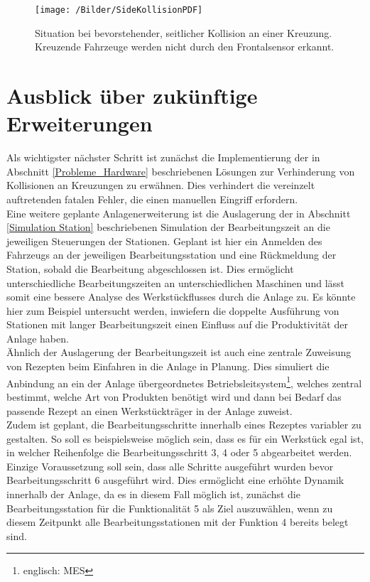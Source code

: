		\begin{figure}[h]
			\centering
			\texttt{[image: /Bilder/SideKollisionPDF]}
			\vspace{0.2cm}
			\caption{Situation bei bevorstehender, seitlicher Kollision an einer Kreuzung. Kreuzende Fahrzeuge werden nicht durch den Frontalsensor erkannt.}\label{SideKollision}
		\end{figure}
	
\section{Ausblick über zukünftige Erweiterungen}
	
	Als wichtigster nächster Schritt ist zunächst die Implementierung der in Abschnitt \ref{Probleme_Hardware} beschriebenen Lösungen zur Verhinderung von Kollisionen an Kreuzungen zu erwähnen. Dies verhindert die vereinzelt auftretenden fatalen Fehler, die einen manuellen Eingriff erfordern.\\
	Eine weitere  geplante Anlagenerweiterung ist die Auslagerung der in Abschnitt \ref{Simulation Station} beschriebenen Simulation der Bearbeitungszeit an die jeweiligen Steuerungen der Stationen. Geplant ist hier ein Anmelden des Fahrzeugs an der jeweiligen Bearbeitungsstation und eine Rückmeldung der Station, sobald die Bearbeitung abgeschlossen ist. Dies ermöglicht unterschiedliche Bearbeitungszeiten an unterschiedlichen Maschinen und lässt somit eine bessere Analyse des Werkstückflusses durch die Anlage zu. Es könnte hier zum Beispiel untersucht werden, inwiefern die doppelte Ausführung von Stationen mit langer Bearbeitungszeit einen Einfluss auf die Produktivität der Anlage haben.
	\\[4pt]
	Ähnlich der Auslagerung der Bearbeitungszeit ist auch eine zentrale Zuweisung von Rezepten beim Einfahren in die Anlage in Planung. Dies simuliert die Anbindung an ein der Anlage übergeordnetes Betriebsleitsystem\footnote{englisch: \ac{MES}}, welches zentral bestimmt, welche Art von Produkten benötigt wird und dann bei Bedarf das passende Rezept an einen Werkstückträger in der Anlage zuweist.
	\\[4pt]
	Zudem ist geplant, die Bearbeitungsschritte innerhalb eines Rezeptes variabler zu gestalten. So soll es beispielsweise möglich sein, dass es für ein Werkstück egal ist, in welcher Reihenfolge die  Bearbeitungsschritt 3, 4 oder 5 abgearbeitet werden. Einzige Voraussetzung soll sein, dass alle Schritte ausgeführt wurden bevor Bearbeitungsschritt 6 ausgeführt wird. Dies ermöglicht eine erhöhte Dynamik innerhalb der Anlage, da es in diesem Fall möglich ist, zunächst die Bearbeitungsstation für die Funktionalität 5 als Ziel auszuwählen, wenn zu diesem Zeitpunkt alle Bearbeitungsstationen mit der Funktion 4 bereits belegt sind.
